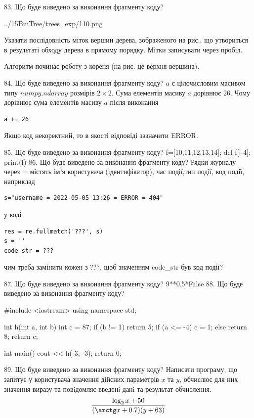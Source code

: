 \documentclass[11pt]{article}
\begin{document}
83. Що буде виведено за виконання фрагменту коду?

\begin{center}
	{../15BinTree/trees_exp/110.png}
\end{center}
Указати послідовність міток вершин дерева, зображеного на рис., що утвориться в результаті обходу дерева в прямому порядку. Мітки записувати через пробіл.\par Алгоритм починає роботу з кореня (на рис. це верхня вершина).

84. Що буде виведено за виконання фрагменту коду?
$a$ є цілочисловим масивом типу $numpy.ndarray$ розмірів $2{\times}2$. Сума елементів масиву $a$ дорівнює 26. Чому дорівнює сума елементів масиву $a$ після виконання 
\begin{verbatim}
a += 26
\end{verbatim}


Якщо код некоректний, то в якості відповіді зазначити ERROR.



85. Що буде виведено за виконання фрагменту коду?
f=[10,11,12,13,14]; del f[:-4]; print(f)
86. Що буде виведено за виконання фрагменту коду?
Рядки журналу через = містять ім'я користувача (ідентифікатор), час події,тип події, код події, наприклад
\begin{verbatim}
s="username = 2022-05-05 13:26 = ERROR = 404"
\end{verbatim}
у коді 
\begin{verbatim}
res = re.fullmatch('???', s) 
s = ''
code_str = ??? 
\end{verbatim}
чим треба замінити кожен з ???, щоб значенням code\_str був код події? 



87. Що буде виведено за виконання фрагменту коду?
9**0.5*False
88. Що буде виведено за виконання фрагменту коду?

#include <iostream>
using namespace std;

int h(int a, int b){
    int c = 87;
    if (b != 1)
        return 5;
    if (a <= -4)
         c = 1;
    else 
        return 8;
    return c;
}

int main(){
    cout << h(-3, -3);
    return 0;
}

89. Що буде виведено за виконання фрагменту коду?
Написати програму, що запитує у користувача значення дійсних параметрів $x$ та $y$, обчислює для них значення виразу та повiдомляє введенi данi та результат обчислення.
$$\frac{\log_{2} x + 50}{(\arctg x + 0.7) (y + 63)}$$ 
\end{document}
